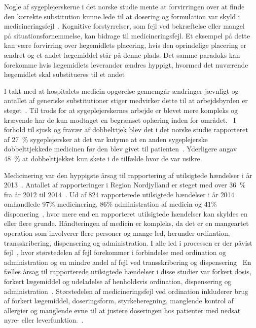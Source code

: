 Nogle af sygeplejerskerne i det norske studie mente at forvirringen over at finde den korrekte substitution kunne lede til at dosering og formulation var skyld i medicineringsfejl~\citep{Hakonsen2010}. Kognitive forstyrrelser, som fejl ved bekræftelse eller mangel på situationsfornemmelse, kan bidrage til medicineringsfejl. Et eksempel på dette kan være forvirring over lægemidlets placering, hvis den oprindelige placering er ændret og et andet lægemiddel står på denne plads. Det samme paradoks kan forekomme hvis lægemidlets leverandør ændres hyppigt, hvormed det nuværende lægemidlet skal substitueres til et andet~\citep{Wittich2014}

I takt med at hospitalets medicin opgørelse gennemgår ændringer jævnligt og antallet af generiske  substitutioner stiger medvirker dette til at arbejdsbyrden er steget~\citep{Hakonsen2010}. Til trods for at sygeplejerskernes arbejde er blevet mere kompleks og krævende har de kun modtaget en begrænset oplæring inden for området.~\citep{Hakonsen2010} I forhold til sjusk og fravær af dobbelttjek blev det i det norske studie rapporteret af 27~\% sygeplejersker at det var kutyme at en anden sygeplejerske dobbelttjekkede medicinen før den blev givet til patienten~\citep{Hakonsen2010}. Yderligere angav 48~\% at dobbelttjekket kun skete i de tilfælde hvor de var usikre.~\citep{Hakonsen2010} 

Medicinering var den hyppigste årsag til rapportering af utilsigtede hændelser i år 2013~\citep{Patientombuddet2013}. Antallet af rapporteringer i Region Nordjylland er steget med over 36~\% fra år 2012 til 2014~\citep{Jensen2014}. Ud af 824 rapporterede utilsigtede hændelser i år 2014 omhandlede 97\% medicinering, 86\% administration af medicin og 41\% disponering~\citep{Jensen2014}, hvor mere end en rapporteret  utilsigtede hændelser kan skyldes en eller flere grunde. 
Håndteringen af medicin er kompleks, da det er en mangeartet operation som involverer flere personer og mange led, herunder ordination, transskribering, dispensering og administration. I alle led i processen er der påvist fejl~\citep{Barker2002,Sundhedsstyrelsen2005, Lisby2005, Tully2009}, hvor størstedelen af fejl forekommer i forbindelse med ordination og administration og en mindre andel af fejl ved transskribering og dispensering~\citep{Agrawal2009, Anderson2002} 
En fælles årsag til rapporterede utilsigtede hændelser i disse studier var forkert dosis, forkert lægemiddel og udeladelse af henholdsvis ordination, dispensering og administration~\citep{Barker2002,Sundhedsstyrelsen2005,Lisby2005, Tully2009}.
Størstedelen af medicineringsfejl ved ordination inkluderer brug af forkert lægemiddel, doseringsform, styrkeberegning, manglende kontrol af allergier og manglende evne til at justere doseringen hos patienter med nedsat nyre- eller leverfunktion.~\citep{Agrawal2009}.


